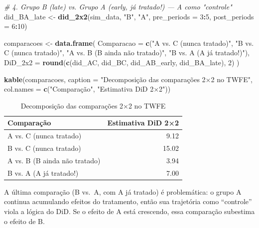 \documentclass[
]{article}
\newenvironment{Shaded}{\begin{snugshade}}{\end{snugshade}}
\newcommand{\AttributeTok}[1]{\textcolor[rgb]{0.13,0.29,0.53}{#1}}
\newcommand{\CommentTok}[1]{\textcolor[rgb]{0.56,0.35,0.01}{\textit{#1}}}
\newcommand{\DecValTok}[1]{\textcolor[rgb]{0.00,0.00,0.81}{#1}}
\newcommand{\FunctionTok}[1]{\textcolor[rgb]{0.13,0.29,0.53}{\textbf{#1}}}
\newcommand{\NormalTok}[1]{#1}
\newcommand{\OtherTok}[1]{\textcolor[rgb]{0.56,0.35,0.01}{#1}}
\newcommand{\SpecialCharTok}[1]{\textcolor[rgb]{0.81,0.36,0.00}{\textbf{#1}}}
\newcommand{\StringTok}[1]{\textcolor[rgb]{0.31,0.60,0.02}{#1}}
\begin{document}
\begin{Shaded}
\begin{Highlighting}[]
\CommentTok{\# 4. Grupo B (late) vs. Grupo A (early, já tratado!) — A como "controle"}
\NormalTok{did\_BA\_late }\OtherTok{\textless{}{-}} \FunctionTok{did\_2x2}\NormalTok{(sim\_data, }\StringTok{"B"}\NormalTok{, }\StringTok{"A"}\NormalTok{, }\AttributeTok{pre\_periods =} \DecValTok{3}\SpecialCharTok{:}\DecValTok{5}\NormalTok{, }\AttributeTok{post\_periods =} \DecValTok{6}\SpecialCharTok{:}\DecValTok{10}\NormalTok{)}

\NormalTok{comparacoes }\OtherTok{\textless{}{-}} \FunctionTok{data.frame}\NormalTok{(}
  \AttributeTok{Comparacao =} \FunctionTok{c}\NormalTok{(}\StringTok{"A vs. C (nunca tratado)"}\NormalTok{,}
                 \StringTok{"B vs. C (nunca tratado)"}\NormalTok{,}
                 \StringTok{"A vs. B (B ainda não tratado)"}\NormalTok{,}
                 \StringTok{"B vs. A (A já tratado!)"}\NormalTok{),}
  \AttributeTok{DiD\_2x2 =} \FunctionTok{round}\NormalTok{(}\FunctionTok{c}\NormalTok{(did\_AC, did\_BC, did\_AB\_early, did\_BA\_late), }\DecValTok{2}\NormalTok{)}
\NormalTok{)}

\FunctionTok{kable}\NormalTok{(comparacoes, }\AttributeTok{caption =} \StringTok{"Decomposição das comparações 2×2 no TWFE"}\NormalTok{,}
      \AttributeTok{col.names =} \FunctionTok{c}\NormalTok{(}\StringTok{"Comparação"}\NormalTok{, }\StringTok{"Estimativa DiD 2×2"}\NormalTok{))}
\end{Highlighting}
\end{Shaded}

\begin{table}

\caption{\label{tab:bacon-decomp-manual}Decomposição das comparações 2×2 no TWFE}
\centering
\begin{tabular}[t]{l|r}
\hline
Comparação & Estimativa DiD 2×2\\
\hline
A vs. C (nunca tratado) & 9.12\\
\hline
B vs. C (nunca tratado) & 15.02\\
\hline
A vs. B (B ainda não tratado) & 3.94\\
\hline
B vs. A (A já tratado!) & 7.00\\
\hline
\end{tabular}
\end{table}

A última comparação (B vs.~A, com A já tratado) é problemática: o grupo A continua acumulando efeitos do tratamento, então sua trajetória como ``controle'' viola a lógica do DiD. Se o efeito de A está crescendo, essa comparação subestima o efeito de B.
\end{document}
